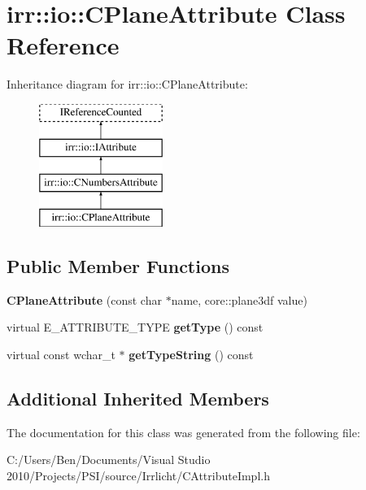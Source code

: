 \hypertarget{classirr_1_1io_1_1_c_plane_attribute}{\section{irr\-:\-:io\-:\-:C\-Plane\-Attribute Class Reference}
\label{classirr_1_1io_1_1_c_plane_attribute}
}
Inheritance diagram for irr\-:\-:io\-:\-:C\-Plane\-Attribute\-:\begin{figure}[H]
\begin{center}
\leavevmode
\includegraphics[height=4.000000cm]{classirr_1_1io_1_1_c_plane_attribute}
\end{center}
\end{figure}
\subsection*{Public Member Functions}
\begin{DoxyCompactItemize}
\item 
\hypertarget{classirr_1_1io_1_1_c_plane_attribute_a7514e5fbf24d53670782bb5cdd029cfe}{{\bfseries C\-Plane\-Attribute} (const char $\ast$name, core\-::plane3df value)}\label{classirr_1_1io_1_1_c_plane_attribute_a7514e5fbf24d53670782bb5cdd029cfe}

\item 
\hypertarget{classirr_1_1io_1_1_c_plane_attribute_a92da5bc77f295cc00c2b85a4e6aa3f4e}{virtual E\-\_\-\-A\-T\-T\-R\-I\-B\-U\-T\-E\-\_\-\-T\-Y\-P\-E {\bfseries get\-Type} () const }\label{classirr_1_1io_1_1_c_plane_attribute_a92da5bc77f295cc00c2b85a4e6aa3f4e}

\item 
\hypertarget{classirr_1_1io_1_1_c_plane_attribute_a9fd32c6cf52cbbc8d1903628682c3d14}{virtual const wchar\-\_\-t $\ast$ {\bfseries get\-Type\-String} () const }\label{classirr_1_1io_1_1_c_plane_attribute_a9fd32c6cf52cbbc8d1903628682c3d14}

\end{DoxyCompactItemize}
\subsection*{Additional Inherited Members}


The documentation for this class was generated from the following file\-:\begin{DoxyCompactItemize}
\item 
C\-:/\-Users/\-Ben/\-Documents/\-Visual Studio 2010/\-Projects/\-P\-S\-I/source/\-Irrlicht/C\-Attribute\-Impl.\-h\end{DoxyCompactItemize}
